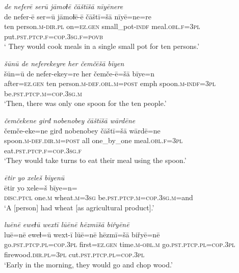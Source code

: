 \ea \label{ŽE.27}
\textit{de neferē serū jāmoɫē čāštīšā nīyēnere} \\ 
\gll de nefer-ē ser=ū jāmoɫē-ē čāštī=šā nīyē=ne=re \\ 
 ten person\textsc{.m}\textsc{-dir}\textsc{.pl} on\textsc{\textsc{=ez.gen}} small\_pot\textsc{-indf} meal\textsc{.obl}\textsc{.f}\textsc{=3pl} put\textsc{.pst}\textsc{.ptcp}\textsc{.f}\textsc{=cop}\textsc{.3sg}\textsc{.f}\textsc{=\textsc{povb}} \\ 
\glt ` They would cook meals in a single small pot for ten persons.'
\z 
 
\ea \label{ŽE.28}
\textit{šūnū de neferekeyre her čemčēšā bīyen} \\ 
\gll šūn=ū de nefer-ekey=re her čemče-ē=šā bīye=n \\ 
 after\textsc{\textsc{=ez.gen}} ten person\textsc{.m}\textsc{-def}\textsc{.obl}\textsc{.m}\textsc{=\textsc{post}} emph spoon\textsc{.m}\textsc{-indf}\textsc{=3pl} be\textsc{.pst}\textsc{.ptcp}\textsc{.m}\textsc{=cop}\textsc{.3sg}\textsc{.m} \\ 
\glt `Then, there was only one spoon for the ten people.'
\z 
 
\ea \label{ŽE.29}
\textit{čemčekene girđ nobenobey čāštīšā wārdēne} \\ 
\gll čemče-eke=ne girđ nobenobey čāštī=šā wārdē=ne \\ 
 spoon\textsc{.m}\textsc{-def}\textsc{.dir}\textsc{.m}\textsc{=\textsc{post}} all one\_by\_one meal\textsc{.obl}\textsc{.f}\textsc{=3pl} eat\textsc{.pst}\textsc{.ptcp}\textsc{.f}\textsc{=cop}\textsc{.3sg}\textsc{.f} \\ 
\glt `They would take turns to eat their meal using the spoon.'
\z 
 
\ea \label{ŽE.30}
\textit{ētir yo xeleš bīyenū} \\ 
\gll ētir yo xele=š bīye=n=\\ 
 \textsc{disc.ptcl} one\textsc{.m} wheat\textsc{.m}\textsc{=3sg} be\textsc{.pst}\textsc{.ptcp}\textsc{.m}\textsc{=cop}\textsc{.3sg}\textsc{.m}=and \\ 
\glt `A [person] had wheat [as agricultural product].'
\z 
 
\ea \label{ŽE.33}
\textit{luēnē eweɫū wextī lūēnē hēzmīšā biřyēnē} \\ 
\gll luē=nē eweɫ=ū wext-ī lūē=nē hēzmī=šā biřyē=nē \\ 
 go\textsc{.pst}\textsc{.ptcp}\textsc{.pl}\textsc{=cop}\textsc{.3pl} first\textsc{\textsc{=ez.gen}} time\textsc{.m}\textsc{-obl}\textsc{.m} go\textsc{.pst}\textsc{.ptcp}\textsc{.pl}\textsc{=cop}\textsc{.3pl} firewood\textsc{.dir}\textsc{.pl}\textsc{=3pl} cut\textsc{.pst}\textsc{.ptcp}\textsc{.pl}\textsc{=cop}\textsc{.3pl} \\ 
\glt `Early in the morning, they would go and chop wood.'
\z 
 
